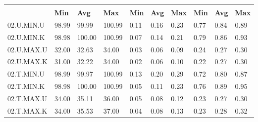 \begin{tabular}{|>{\raggedright}p{}|>{\raggedright}p{}|>{\raggedright}p{}|>{\raggedright}p{}|>{\raggedright}p{}|>{\raggedright}p{}|>{\raggedright}p{}|>{\raggedright}p{}|>{\raggedright}p{}|>{\raggedright}p{}|}
\hline 
\multirow{2}{0.12\columnwidth}{\textbf{\footnotesize{}Bezeichnung}} & \multicolumn{3}{l|}{\textbf{\footnotesize{}CPU-Last {[}\%{]}}} & \multicolumn{3}{l|}{\textbf{\footnotesize{}Systemtime {[}s{]}}} & \multicolumn{3}{l|}{\textbf{\footnotesize{}Usertime {[}s{]}}}\tabularnewline
\cline{2-10} 
& \textbf{\footnotesize{}Min} & \textbf{\footnotesize{}Avg} & \textbf{\footnotesize{}Max} & \textbf{\footnotesize{}Min} & \textbf{\footnotesize{}Avg} & \textbf{\footnotesize{}Max} & \textbf{\footnotesize{}Min} & \textbf{\footnotesize{}Avg} & \textbf{\footnotesize{}Max}\tabularnewline
\hline 
\hline 
{\footnotesize{}02.U.MIN.U} & {\footnotesize{}98.99} & {\footnotesize{}99.99} & {\footnotesize{}100.99} & {\footnotesize{}0.11} & {\footnotesize{}0.16} & {\footnotesize{}0.23} & {\footnotesize{}0.77} & {\footnotesize{}0.84} & {\footnotesize{}0.89}\tabularnewline
\hline 
\hline 
{\footnotesize{}02.U.MIN.K} & {\footnotesize{}98.98} & {\footnotesize{}100.00} & {\footnotesize{}100.99} & {\footnotesize{}0.07} & {\footnotesize{}0.14} & {\footnotesize{}0.21} & {\footnotesize{}0.79} & {\footnotesize{}0.86} & {\footnotesize{}0.93}\tabularnewline
\hline 
\hline 
{\footnotesize{}02.U.MAX.U} & {\footnotesize{}32.00} & {\footnotesize{}32.63} & {\footnotesize{}34.00} & {\footnotesize{}0.03} & {\footnotesize{}0.06} & {\footnotesize{}0.09} & {\footnotesize{}0.24} & {\footnotesize{}0.27} & {\footnotesize{}0.30}\tabularnewline
\hline 
\hline 
{\footnotesize{}02.U.MAX.K} & {\footnotesize{}31.00} & {\footnotesize{}32.22} & {\footnotesize{}34.00} & {\footnotesize{}0.02} & {\footnotesize{}0.06} & {\footnotesize{}0.10} & {\footnotesize{}0.22} & {\footnotesize{}0.27} & {\footnotesize{}0.30}\tabularnewline
\hline 
\hline 
{\footnotesize{}02.T.MIN.U} & {\footnotesize{}98.99} & {\footnotesize{}99.97} & {\footnotesize{}100.99} & {\footnotesize{}0.13} & {\footnotesize{}0.20} & {\footnotesize{}0.29} & {\footnotesize{}0.72} & {\footnotesize{}0.80} & {\footnotesize{}0.87}\tabularnewline
\hline 
\hline 
{\footnotesize{}02.T.MIN.K} & {\footnotesize{}98.98} & {\footnotesize{}100.00} & {\footnotesize{}100.99} & {\footnotesize{}0.05} & {\footnotesize{}0.11} & {\footnotesize{}0.23} & {\footnotesize{}0.76} & {\footnotesize{}0.89} & {\footnotesize{}0.95}\tabularnewline
\hline 
\hline 
{\footnotesize{}02.T.MAX.U} & {\footnotesize{}34.00} & {\footnotesize{}35.11} & {\footnotesize{}36.00} & {\footnotesize{}0.05} & {\footnotesize{}0.08} & {\footnotesize{}0.12} & {\footnotesize{}0.23} & {\footnotesize{}0.27} & {\footnotesize{}0.30}\tabularnewline
\hline 
\hline 
{\footnotesize{}02.T.MAX.K} & {\footnotesize{}34.00} & {\footnotesize{}35.53} & {\footnotesize{}37.00} & {\footnotesize{}0.04} & {\footnotesize{}0.08} & {\footnotesize{}0.13} & {\footnotesize{}0.23} & {\footnotesize{}0.28} & {\footnotesize{}0.32}\tabularnewline
\hline 
\end{tabular}
\par
